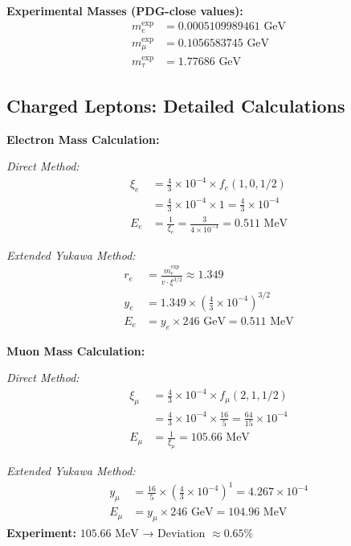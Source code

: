 \documentclass[12pt,a4paper]{article}
\begin{document}
	\textbf{Experimental Masses (PDG-close values):}
	\begin{align}
		m_e^{\text{exp}} &= 0.0005109989461 \text{ GeV} \\
		m_\mu^{\text{exp}} &= 0.1056583745 \text{ GeV} \\
		m_\tau^{\text{exp}} &= 1.77686 \text{ GeV}
	\end{align}
	
	\subsection{Charged Leptons: Detailed Calculations}
	\label{subsec:charged_leptons_detailed}
	
	\textbf{Electron Mass Calculation:}
	
	\textit{Direct Method:}
	\begin{align}
		\xi_e &= \frac{4}{3} \times 10^{-4} \times f_e(1,0,1/2) \\
		&= \frac{4}{3} \times 10^{-4} \times 1 = \frac{4}{3} \times 10^{-4} \\
		E_{e} &= \frac{1}{\xi_e} = \frac{3}{4 \times 10^{-4}} = 0.511 \text{ MeV}
	\end{align}
	
	\textit{Extended Yukawa Method:}
	\begin{align}
		r_e &= \frac{m_e^{\text{exp}}}{v \cdot \xi^{3/2}} \approx 1.349 \\
		y_e &= 1.349 \times \left(\frac{4}{3} \times 10^{-4}\right)^{3/2} \\
		E_e &= y_e \times 246 \text{ GeV} = 0.511 \text{ MeV}
	\end{align}
	
	\textbf{Muon Mass Calculation:}
	
	\textit{Direct Method:}
	\begin{align}
		\xi_\mu &= \frac{4}{3} \times 10^{-4} \times f_\mu(2,1,1/2) \\
		&= \frac{4}{3} \times 10^{-4} \times \frac{16}{5} = \frac{64}{15} \times 10^{-4} \\
		E_{\mu} &= \frac{1}{\xi_\mu} = 105.66 \text{ MeV}
	\end{align}
	
	\textit{Extended Yukawa Method:}
	\begin{align}
		y_\mu &= \frac{16}{5} \times \left(\frac{4}{3} \times 10^{-4}\right)^1 = 4.267 \times 10^{-4} \\
		E_\mu &= y_\mu \times 246 \text{ GeV} = 104.96 \text{ MeV}
	\end{align}
	\textbf{Experiment:} $105.66 \text{ MeV}$ → Deviation $\approx 0.65\%$
	
\end{document}
